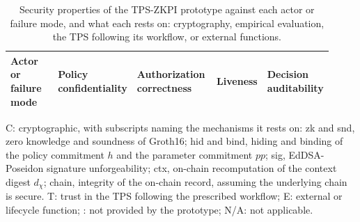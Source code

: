 \begin{table}[htbp]
  \centering\small
  \caption{Security properties of the TPS-ZKPI prototype against each actor or failure
    mode, and what each rests on: cryptography, empirical evaluation, the TPS following
    its workflow, or external functions.}
  \label{tab:threat-guarantee}
  \setlength{\tabcolsep}{3pt}
  \renewcommand{\arraystretch}{1.12}
  \begin{tabular}{>{\raggedright\arraybackslash}p{0.16\linewidth}>{\raggedright\arraybackslash}p{0.23\linewidth}>{\raggedright\arraybackslash}p{0.25\linewidth}>{\raggedright\arraybackslash}p{0.10\linewidth}>{\raggedright\arraybackslash}p{0.18\linewidth}}
    \toprule
    Actor or failure mode & Policy confidentiality & Authorization correctness & Liveness & Decision auditability \\
    \midrule
    
  \end{tabular}

  \begin{tablenote}
    C: cryptographic, with subscripts naming the mechanisms it rests on: zk and snd, zero knowledge and soundness of Groth16; hid and bind, hiding and binding of the policy commitment $h$ and the parameter commitment $\mathit{pp}$; sig, EdDSA-Poseidon signature unforgeability; ctx, on-chain recomputation of the context digest $d_{\chi}$; chain, integrity of the on-chain record, assuming the underlying chain is secure. T: trust in the TPS following the prescribed workflow; E: external or lifecycle function; \xmark: not provided by the prototype; N/A: not applicable.
  \end{tablenote}
\end{table}

